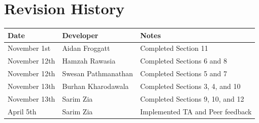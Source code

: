 \section{Revision History}

\begin{tabularx}{\textwidth}{llX}
\toprule
{\bf Date} & {\bf Developer} & {\bf Notes} \\
\midrule
November 1st & Aidan Froggatt & Completed Section 11 \\
November 12th & Hamzah Rawasia & Completed Sections 6 and 8 \\
November 12th & Swesan Pathmanathan & Completed Sections 5 and 7 \\
November 13th & Burhan Kharodawala & Completed Sections 3, 4, and 10 \\
November 13th & Sarim Zia & Completed Sections 9, 10, and 12 \\
April 5th & Sarim Zia & Implemented TA and Peer feedback \\
\bottomrule
\end{tabularx}

\newpage